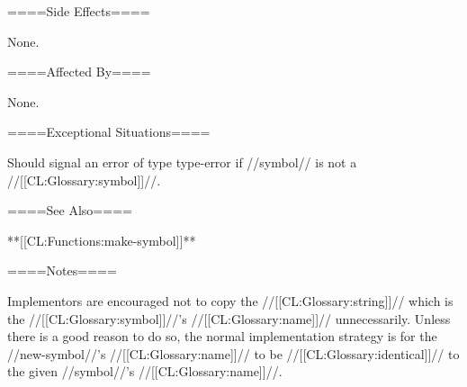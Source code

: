 ====Side Effects====

None.

====Affected By====

None.

====Exceptional Situations====

Should signal an error of type type-error if //symbol// is not a //[[CL:Glossary:symbol]]//.

====See Also====

**[[CL:Functions:make-symbol]]**

====Notes====

Implementors are encouraged not to copy the //[[CL:Glossary:string]]// which is the //[[CL:Glossary:symbol]]//'s //[[CL:Glossary:name]]// unnecessarily. Unless there is a good reason to do so, the normal implementation strategy is for the //new-symbol//'s //[[CL:Glossary:name]]// to be //[[CL:Glossary:identical]]// to the given //symbol//'s //[[CL:Glossary:name]]//.

 
